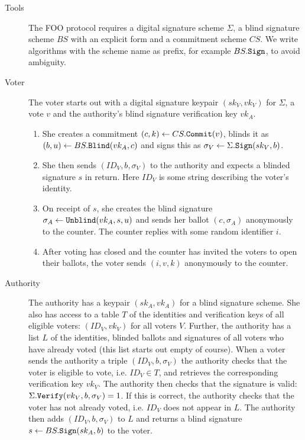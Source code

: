 \documentclass{llncs}
\newcommand{\alg}[1]{\textup{\texttt{#1}}}
\begin{document}
\begin{description}
\item[Tools] The FOO protocol requires a digital signature scheme $\Sigma$, a
blind signature scheme $BS$ with an explicit form and a commitment scheme $CS$.
We write algorithms with the scheme name as prefix, for example $BS.\alg{Sign}$,
to avoid ambiguity.

\item[Voter] The voter starts out with a digital signature keypair $(sk_V,
vk_V)$ for $\Sigma$, a vote $v$ and the authority's blind signature
verification key $vk_A$.
\begin{enumerate}
\item She creates a commitment $(c, k) \gets CS.\alg{Commit}(v)$, blinds it as
$(b, u) \gets BS.\alg{Blind}(vk_A, c)$ and signs this as $\sigma_V \gets
\Sigma.\alg{Sign}(sk_V, b)$.
\item She then sends $(ID_V, b, \sigma_V)$ to the authority and expects a
blinded signature $s$ in return. Here $ID_V$ is some string describing the
voter's identity.
\item On receipt of $s$, she creates the blind signature $\sigma_A \gets \alg{Unblind}(vk_A, s, u)$ and sends her ballot $(c, \sigma_A)$ anonymously to the counter. The counter replies with some random identifier $i$.
\item After voting has closed and the counter has invited the voters to open
their ballots, the voter sends $(i, v, k)$ anonymously to the counter.
\end{enumerate}

\item[Authority]
The authority has a keypair $(sk_A, vk_A)$ for a blind signature scheme. She
also has access to a table $T$ of the identities and verification keys of all
eligible voters: $(ID_V, vk_V)$ for all voters $V$.
Further, the authority has a list $L$ of the identities, blinded ballots
and signatures of all voters who have already voted (this list starts out empty
of course).
When a voter sends the authority a triple $(ID_V, b, \sigma_V)$ the
authority checks that the voter is eligible to vote, i.e. $ID_V \in T$, and retrieves the corresponding verification key $vk_V$.
The authority then checks that the signature is valid: $\Sigma.\alg{Verify}(vk_V, b, \sigma_V) = 1$. If this is correct, the authority checks that the voter has not already voted, i.e. $ID_V$ does not appear in $L$.
The authority then adds $(ID_V, b, \sigma_V)$ to $L$ and returns a blind
signature $s \gets BS.\alg{Sign}(sk_A, b)$ to the voter.


\end{description}
\end{document}
